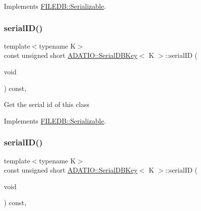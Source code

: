 Implements \mbox{\hyperlink{classFILEDB_1_1Serializable_a21a5831fa4f65790490a8a5eba9fcab2}{F\+I\+L\+E\+D\+B\+::\+Serializable}}.

\mbox{\label{classADATIO_1_1SerialDBKey_a0d088e08f453fd38a906208783f788d7}} 
\subsubsection{\texorpdfstring{serialID()}{serialID()}\hspace{0.1cm}{\footnotesize\ttfamily [1/2]}}
{\footnotesize\ttfamily template$<$typename K$>$ \\
const unsigned short \mbox{\hyperlink{classADATIO_1_1SerialDBKey}{A\+D\+A\+T\+I\+O\+::\+Serial\+D\+B\+Key}}$<$ K $>$\+::serial\+ID (\begin{DoxyParamCaption}\item[{void}]{ }\end{DoxyParamCaption}) const\hspace{0.3cm}{\ttfamily [inline]}, {\ttfamily [virtual]}}

Get the serial id of this class 

Implements \mbox{\hyperlink{classFILEDB_1_1Serializable_a5d639b5dbd5d8ebc7dca1eca31bbc868}{F\+I\+L\+E\+D\+B\+::\+Serializable}}.

\mbox{\label{classADATIO_1_1SerialDBKey_a0d088e08f453fd38a906208783f788d7}} 
\subsubsection{\texorpdfstring{serialID()}{serialID()}\hspace{0.1cm}{\footnotesize\ttfamily [2/2]}}
{\footnotesize\ttfamily template$<$typename K$>$ \\
const unsigned short \mbox{\hyperlink{classADATIO_1_1SerialDBKey}{A\+D\+A\+T\+I\+O\+::\+Serial\+D\+B\+Key}}$<$ K $>$\+::serial\+ID (\begin{DoxyParamCaption}\item[{void}]{ }\end{DoxyParamCaption}) const\hspace{0.3cm}{\ttfamily [inline]}, {\ttfamily [virtual]}}

